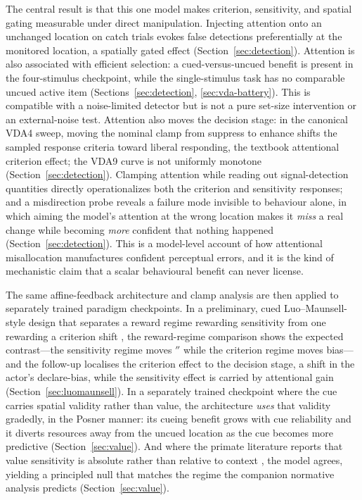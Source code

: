 The central result is that this one model makes criterion, sensitivity, and spatial
gating measurable under direct manipulation. Injecting attention onto an unchanged
location on catch trials evokes false detections preferentially at the monitored
location, a spatially gated effect
(Section~\ref{sec:detection}). Attention is also associated with efficient selection:
a cued-versus-uncued benefit is present in the four-stimulus checkpoint, while the
single-stimulus task has no comparable uncued active item
(Sections~\ref{sec:detection}, \ref{sec:vda-battery}). This is compatible with a
noise-limited detector but is not a pure set-size intervention or an external-noise test. Attention also moves
the decision stage: in the canonical VDA4 sweep, moving the nominal clamp from
suppress to enhance shifts the sampled response criteria toward liberal responding,
the textbook attentional criterion effect; the VDA9 curve is not uniformly monotone
(Section~\ref{sec:detection}). Clamping attention while reading out
signal-detection quantities directly operationalizes both the criterion and
sensitivity responses; and a
misdirection probe reveals a failure mode invisible to behaviour alone, in which
aiming the model's attention at the wrong location makes it \emph{miss} a real
change while becoming \emph{more} confident that nothing happened
(Section~\ref{sec:detection}). This is a model-level account of how attentional
misallocation manufactures confident perceptual errors, and it is the kind of
mechanistic claim that a scalar behavioural benefit can never license.

The same affine-feedback architecture and clamp analysis are then applied to separately
trained paradigm checkpoints. In a preliminary, cued Luo--Maunsell-style design
that separates a reward regime rewarding sensitivity from one rewarding a
criterion shift \cite{luo_maunsell2018_criterion_sensitivity}, the reward-regime comparison shows the expected contrast---the sensitivity regime moves $\dprime$ while the criterion
regime moves bias---and the follow-up localises the criterion effect to the
decision stage, a shift in the actor's declare-bias, while the sensitivity
effect is carried by attentional gain
(Section~\ref{sec:luomaunsell}). In a separately trained checkpoint where the cue carries spatial validity rather
than value, the architecture \emph{uses} that validity gradedly, in the Posner manner:
its cueing benefit grows with cue reliability and it diverts resources away from
the uncued location as the cue becomes more predictive
(Section~\ref{sec:value}). And where the primate literature reports that value
sensitivity is absolute rather than relative to context
\cite{baruni2015}, the model agrees, yielding a principled null
that matches the regime the companion normative analysis predicts
(Section~\ref{sec:value}).

